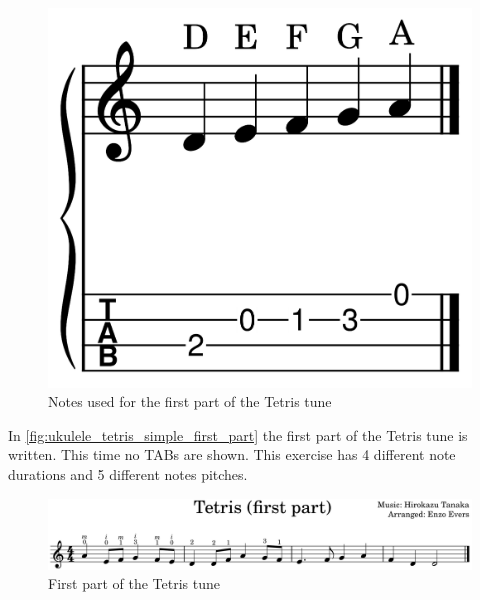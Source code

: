 \begin{figure}[h]
	\centering
	\includegraphics[height=0.12\textheight]{../../MuseScore/Ukulele/UkuleleNotesUsedInTetrisFirstPart.png}
	\caption{Notes used for the first part of the Tetris tune}
	\label{fig:ukulele_notes_for_tetris_first_part}
\end{figure}

In \autoref{fig:ukulele_tetris_simple_first_part} the first part of the Tetris tune is written. This time no TABs are shown. This exercise has 4 different note durations and 5 different notes pitches.

\begin{figure}[h]
	\centering
	\includegraphics[width=\textwidth]{../../MuseScore/Ukulele/UkuleleTetrisSimpleFirstPart.png}
	\caption{First part of the Tetris tune}
	\label{fig:ukulele_tetris_simple_first_part}
\end{figure}



\newpage

